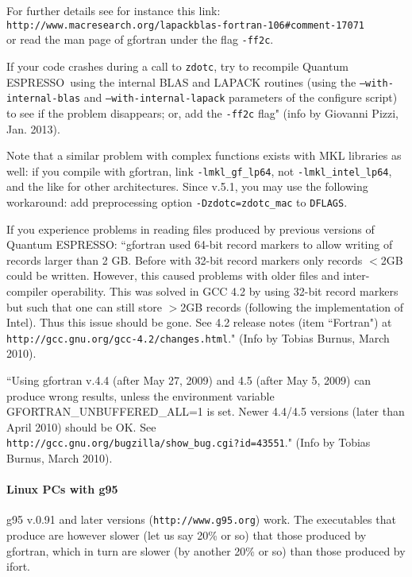 \documentclass[12pt,a4paper]{article}
\def\qe{{\sc Quantum ESPRESSO}}
\begin{document}
For further details see for instance this link:\\
\texttt{http://www.macresearch.org/lapackblas-fortran-106\#comment-17071}\\
or read the man page of gfortran under the flag \texttt{-ff2c}.

If your code crashes during a call to \texttt{zdotc},
try to recompile \qe\ using the internal BLAS and LAPACK
routines (using the \texttt{--with-internal-blas} and 
\texttt{--with-internal-lapack} parameters of the configure script)
to see if the problem disappears; or, add the \texttt{-ff2c} flag"
(info by Giovanni Pizzi, Jan. 2013).

Note that a similar problem with complex functions exists with MKL libraries
as well: if you compile with gfortran, link \texttt{-lmkl\_gf\_lp64},
not \texttt{-lmkl\_intel\_lp64}, and the like for other architectures.
Since v.5.1, you may use the following workaround:
add preprocessing option \texttt{-Dzdotc=zdotc\_mac} to \texttt{DFLAGS}.

If you experience problems in reading files produced by previous versions
of \qe: ``gfortran used 64-bit record markers to allow writing of records 
larger than 2 GB. Before with 32-bit record markers only records $<$2GB 
could be written. However, this caused problems with older files and 
inter-compiler operability. This was solved in GCC 4.2 by using 32-bit 
record markers but such that one can still store $>$2GB records (following 
the implementation of Intel). Thus this issue should be gone. See 4.2 
release notes (item ``Fortran") at 
\texttt{http://gcc.gnu.org/gcc-4.2/changes.html}."
(Info by Tobias Burnus, March 2010).

``Using gfortran v.4.4 (after May 27, 2009) and 4.5 (after May 5, 2009) can 
produce wrong results, unless the environment variable
GFORTRAN\_UNBUFFERED\_ALL=1 is set. Newer 4.4/4.5 versions
(later than April 2010) should be OK. See\\
\texttt{http://gcc.gnu.org/bugzilla/show\_bug.cgi?id=43551}."
(Info by Tobias Burnus, March 2010).

\paragraph{Linux PCs with g95}

g95 v.0.91 and later versions (\texttt{http://www.g95.org}) work. 
The executables that produce are however slower (let us say 20\% or so) 
that those produced by gfortran, which in turn are slower 
(by another 20\% or so) than those produced by ifort.
\end{document}
